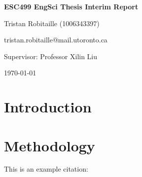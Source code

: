 


    \begin{titlepage}
        \centering
        {\LARGE\bfseries ESC499 EngSci Thesis Interim Report\par}
        \vspace*{\fill}
        \vspace{1cm}
        {\Large Tristan Robitaille (1006343397)\par}
        {\large tristan.robitaille@mail.utoronto.ca\par}
        \vspace{1cm}
        {\large Supervisor: Professor Xilin Liu\par}
        \vfill
        {\large \today\par}
        \thispagestyle{empty}
    \end{titlepage}

    \newpage
    \doublespacing %

    \pagestyle{fancy}
    \fancyhf{}
    \renewcommand{\headrulewidth}{0pt} %
    \rfoot{\thepage} %

    \tableofcontents
    \newpage

    \listoffigures

    \listoftables
    \newpage

    \section{Introduction}
    \lipsum[1-2]

    \section{Methodology}
    This is an example citation: \cite*{li2020ftrans}
    \lipsum[3-4]

    \newpage
    \printbibliography


